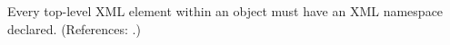 Every top-level XML element within an \Annotation object must have an XML
namespace declared.  (References: .)

